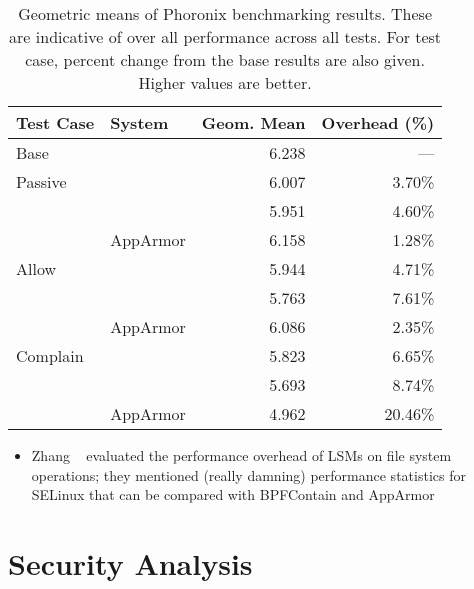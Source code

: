 \begin{table}[htbp]
  \centering
  \caption[Geometric means of Phoronix benchmarking results]{
    Geometric means of Phoronix benchmarking results. These are indicative of over all
    performance across all tests. For test case, percent change from the base results are
    also given. Higher values are better.
  }%
  \label{tab:phoronix-geometric}
  \begin{tabular}{llrr}
  \toprule
   Test Case & System        & Geom. Mean & Overhead (\%)\\
   \midrule
   Base      &               & 6.238          & --- \\
   \midrule
   Passive   & \bpfbox{}     & 6.007          & 3.70\% \\
             & \bpfcontain{} & 5.951          & 4.60\% \\
             & AppArmor      & 6.158          & 1.28\% \\
   \midrule
   Allow     & \bpfbox{}     & 5.944          & 4.71\% \\
             & \bpfcontain{} & 5.763          & 7.61\% \\
             & AppArmor      & 6.086          & 2.35\% \\
   \midrule
   Complain  & \bpfbox{}     & 5.823          & 6.65\% \\
             & \bpfcontain{} & 5.693          & 8.74\% \\
             & AppArmor      & 4.962          & 20.46\% \\
  \bottomrule
  \end{tabular}
\end{table}

\begin{inprogress}
  \begin{itemize}
    \item Zhang \etal~\cite{zhang2021_lsm_file_overhead} evaluated the performance
    overhead of LSMs on file system operations; they mentioned (really damning) performance
    statistics for SELinux that can be compared with BPFContain and AppArmor
  \end{itemize}
\end{inprogress}

\section{Security Analysis}%
\label{s:eval-security}

